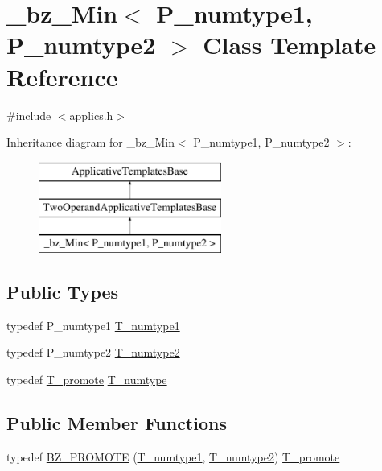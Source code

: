 \hypertarget{class__bz__Min}{}\section{\+\_\+bz\+\_\+\+Min$<$ P\+\_\+numtype1, P\+\_\+numtype2 $>$ Class Template Reference}
\label{class__bz__Min}


{\ttfamily \#include $<$applics.\+h$>$}

Inheritance diagram for \+\_\+bz\+\_\+\+Min$<$ P\+\_\+numtype1, P\+\_\+numtype2 $>$\+:\begin{figure}[H]
\begin{center}
\leavevmode
\includegraphics[height=3.000000cm]{class__bz__Min}
\end{center}
\end{figure}
\subsection*{Public Types}
\begin{DoxyCompactItemize}
\item 
typedef P\+\_\+numtype1 \hyperlink{class__bz__Min_a9e415d4d148ed00301dfdf70c0fd3611}{T\+\_\+numtype1}
\item 
typedef P\+\_\+numtype2 \hyperlink{class__bz__Min_a2956736d3ca4bc512b4970bef75ec675}{T\+\_\+numtype2}
\item 
typedef \hyperlink{minmax_8h_aaa88a440c2f0d00798d5b1d42c79308d}{T\+\_\+promote} \hyperlink{class__bz__Min_a785a27e1158f36d3c41b7d7f32e6d623}{T\+\_\+numtype}
\end{DoxyCompactItemize}
\subsection*{Public Member Functions}
\begin{DoxyCompactItemize}
\item 
typedef \hyperlink{class__bz__Min_a6e4dacf287d1ad3ae349101a842de824}{B\+Z\+\_\+\+P\+R\+O\+M\+O\+T\+E} (\hyperlink{class__bz__Min_a9e415d4d148ed00301dfdf70c0fd3611}{T\+\_\+numtype1}, \hyperlink{class__bz__Min_a2956736d3ca4bc512b4970bef75ec675}{T\+\_\+numtype2}) \hyperlink{minmax_8h_aaa88a440c2f0d00798d5b1d42c79308d}{T\+\_\+promote}
\end{DoxyCompactItemize}
